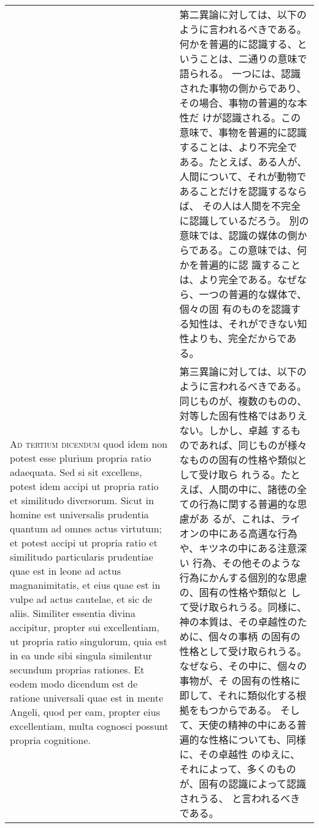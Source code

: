 \documentclass[10pt]{jsarticle} %
\begin{document}
\begin{longtable}{p{21em}p{21em}}
&

 第二異論に対しては、以下のように言われるべきである。
 何かを普遍的に認識する、ということは、二通りの意味で語られる。
 一つには、認識された事物の側からであり、その場合、事物の普遍的な本性だ
 けが認識される。この意味で、事物を普遍的に認識することは、より不完全で
 ある。たとえば、ある人が、人間について、それが動物であることだけを認識するならば、
 その人は人間を不完全に認識しているだろう。
 別の意味では、認識の媒体の側からである。この意味では、何かを普遍的に認
 識することは、より完全である。なぜなら、一つの普遍的な媒体で、個々の固
 有のものを認識する知性は、それができない知性よりも、完全だからである。

\\



{\scshape Ad tertium dicendum} quod idem non potest esse
plurium propria ratio adaequata. Sed si sit excellens, potest idem
accipi ut propria ratio et similitudo diversorum. Sicut in homine est
universalis prudentia quantum ad omnes actus virtutum; et potest accipi
ut propria ratio et similitudo particularis prudentiae quae est in leone
ad actus magnanimitatis, et eius quae est in vulpe ad actus cautelae, et
sic de aliis. Similiter essentia divina accipitur, propter sui
excellentiam, ut propria ratio singulorum, quia est in ea unde sibi
singula similentur secundum proprias rationes. Et eodem modo dicendum
est de ratione universali quae est in mente Angeli, quod per eam,
propter eius excellentiam, multa cognosci possunt propria cognitione.

&

 第三異論に対しては、以下のように言われるべきである。
 同じものが、複数のものの、対等した固有性格ではありえない。しかし、卓越
 するものであれば、同じものが様々なものの固有の性格や類似として受け取ら
 れうる。たとえば、人間の中に、諸徳の全ての行為に関する普遍的な思慮があ
 るが、これは、ライオンの中にある高邁な行為や、キツネの中にある注意深い
 行為、その他そのような行為にかんする個別的な思慮の、固有の性格や類似と
 して受け取られうる。同様に、神の本質は、その卓越性のために、個々の事柄
 の固有の性格として受け取られうる。なぜなら、その中に、個々の事物が、そ
 の固有の性格に即して、それに類似化する根拠をもつからである。
 そして、天使の精神の中にある普遍的な性格についても、同様に、その卓越性
 のゆえに、それによって、多くのものが、固有の認識によって認識されうる、
 と言われるべきである。


\end{longtable}

\newpage
\end{document}
